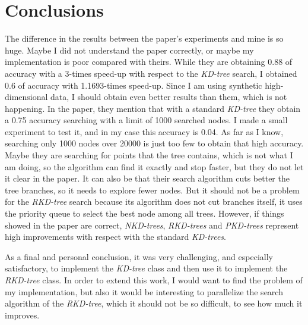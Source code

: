 \section{Conclusions}
The difference in the results between the paper's experiments and mine is so huge. Maybe I did not understand the paper correctly, or maybe my implementation is poor compared with theirs. While they are obtaining 0.88 of accuracy with a 3-times speed-up with respect to the \textit{KD-tree} search, I obtained 0.6 of accuracy with 1.1693-times speed-up. Since I am using synthetic high-dimensional data, I should obtain even better results than them, which is not happening. In the paper, they mention that with a standard \textit{KD-tree} they obtain a 0.75 accuracy searching with a limit of 1000 searched nodes. I made a small experiment to test it, and in my case this accuracy is 0.04. As far as I know, searching only 1000 nodes over 20000 is just too few to obtain that high accuracy. Maybe they are searching for points that the tree contains, which is not what I am doing, so the algorithm can find it exactly and stop faster, but they do not let it clear in the paper. It can also be that their search algorithm cuts better the tree branches, so it needs to explore fewer nodes. But it should not be a problem for the \textit{RKD-tree} search because its algorithm does not cut branches itself, it uses the priority queue to select the best node among all trees.  However, if things showed in the paper are correct, \textit{NKD-trees}, \textit{RKD-trees} and \textit{PKD-trees} represent high improvements with respect with the standard \textit{KD-trees}.

As a final and personal conclusion, it was very challenging, and especially satisfactory, to implement the \textit{KD-tree} class and then use it to implement the \textit{RKD-tree} class. In order to extend this work, I would want to find the problem of my implementation, but also it would be interesting to parallelize the search algorithm of the \textit{RKD-tree}, which it should not be so difficult, to see how much it improves.